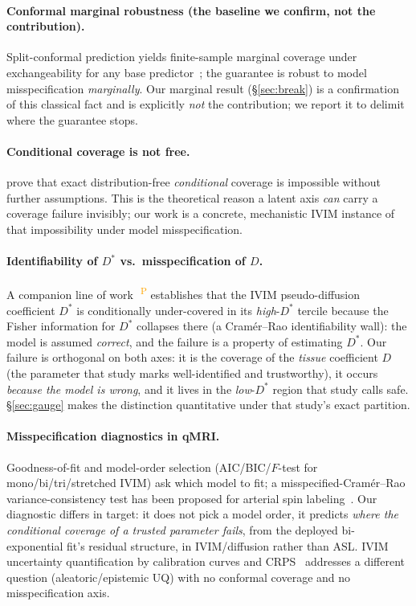 \documentclass[11pt]{article}
\newcommand{\Dstar}{D^{*}}
\newcommand{\PROV}{\textsuperscript{\textcolor{orange}{\,P}}}
\begin{document}
\paragraph{Conformal marginal robustness (the baseline we confirm, not the contribution).}
Split-conformal prediction yields finite-sample marginal coverage under
exchangeability for any base predictor~\citep{vovk2005,lei2018}; the guarantee is
robust to model misspecification \emph{marginally}. Our marginal result
(\S\ref{sec:break}) is a confirmation of this classical fact and is explicitly
\emph{not} the contribution; we report it to delimit where the guarantee stops.

\paragraph{Conditional coverage is not free.} \citet{barber2021} prove that exact
distribution-free \emph{conditional} coverage is impossible without further
assumptions. This is the theoretical reason a latent axis \emph{can} carry a
coverage failure invisibly; our work is a concrete, mechanistic IVIM instance of
that impossibility under model misspecification.

\paragraph{Identifiability of $\Dstar$ vs.\ misspecification of $D$.}
A companion line of work~\citep{gauge}\PROV{} establishes that the IVIM
pseudo-diffusion coefficient $\Dstar$ is conditionally under-covered in its
\emph{high}-$\Dstar$ tercile because the Fisher information for $\Dstar$ collapses
there (a Cram\'er--Rao identifiability wall): the model is assumed \emph{correct},
and the failure is a property of estimating $\Dstar$. Our failure is orthogonal on
both axes: it is the coverage of the \emph{tissue} coefficient $D$ (the parameter
that study marks well-identified and trustworthy), it occurs \emph{because the
model is wrong}, and it lives in the \emph{low}-$\Dstar$ region that study calls
safe. \S\ref{sec:gauge} makes the distinction quantitative under that study's exact
partition. %

\paragraph{Misspecification diagnostics in qMRI.} Goodness-of-fit and model-order
selection (AIC/BIC/$F$-test for mono/bi/tri/stretched IVIM) ask which model to fit;
a misspecified-Cram\'er--Rao variance-consistency test has been proposed for
arterial spin labeling~\citep{wangtamirbush2026}. Our diagnostic differs in target:
it does not pick a model order, it predicts \emph{where the conditional coverage of
a trusted parameter fails}, from the deployed bi-exponential fit's residual
structure, in IVIM/diffusion rather than ASL. IVIM uncertainty quantification by
calibration curves and CRPS~\citep{casali2026} addresses a different question
(aleatoric/epistemic UQ) with no conformal coverage and no misspecification axis.
\end{document}
